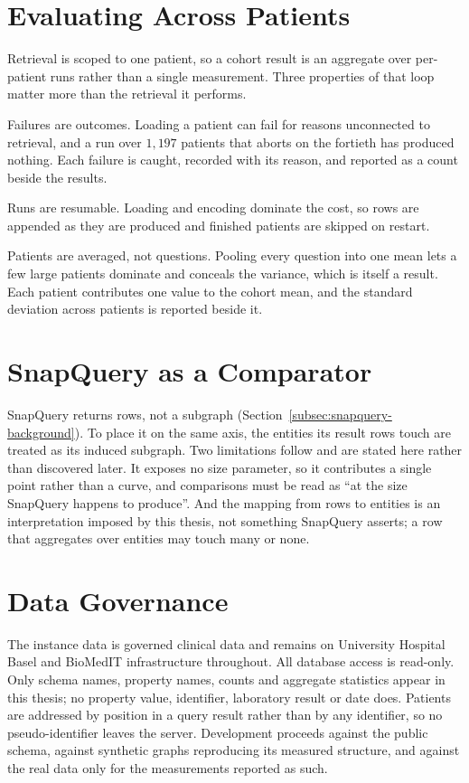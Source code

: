 \section{Evaluating Across Patients} \label{sec:methodology-multipatient}

Retrieval is scoped to one patient, so a cohort result is an aggregate over
per-patient runs rather than a single measurement. Three properties of that loop
matter more than the retrieval it performs.

Failures are outcomes. Loading a patient can fail for reasons unconnected to
retrieval, and a run over $1{,}197$ patients that aborts on the fortieth has
produced nothing. Each failure is caught, recorded with its reason, and reported
as a count beside the results.

Runs are resumable. Loading and encoding dominate the cost, so rows are appended
as they are produced and finished patients are skipped on restart.

Patients are averaged, not questions. Pooling every question into one mean lets
a few large patients dominate and conceals the variance, which is itself a
result. Each patient contributes one value to the cohort mean, and the standard
deviation across patients is reported beside it.

\section{SnapQuery as a Comparator} \label{sec:methodology-snapquery}

SnapQuery returns rows, not a subgraph (Section~\ref{subsec:snapquery-background}).
To place it on the same axis, the entities its result rows touch are treated as
its induced subgraph. Two limitations follow and are stated here rather than
discovered later. It exposes no size parameter, so it contributes a single point
rather than a curve, and comparisons must be read as ``at the size SnapQuery
happens to produce''. And the mapping from rows to entities is an interpretation
imposed by this thesis, not something SnapQuery asserts; a row that aggregates
over entities may touch many or none.

\section{Data Governance} \label{sec:methodology-governance}

The instance data is governed clinical data and remains on University Hospital
Basel and BioMedIT infrastructure throughout. All database access is read-only.
Only schema names, property names, counts and aggregate statistics appear in this
thesis; no property value, identifier, laboratory result or date does. Patients
are addressed by position in a query result rather than by any identifier, so no
pseudo-identifier leaves the server. Development proceeds against the public
schema, against synthetic graphs reproducing its measured structure, and against
the real data only for the measurements reported as such.
